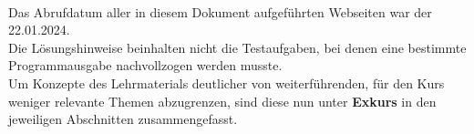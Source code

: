 \Hinweise

\paragraph*{}

Das Abrufdatum aller in diesem Dokument aufgeführten Webseiten war der 22.01.2024.\\

Die Lösungshinweise beinhalten nicht die Testaufgaben, bei denen eine bestimmte Programmausgabe nachvollzogen werden musste.\\

Um Konzepte des Lehrmaterials deutlicher von weiterführenden, für den Kurs weniger relevante Themen abzugrenzen, sind diese nun unter \textbf{Exkurs} in den jeweiligen Abschnitten zusammengefasst.